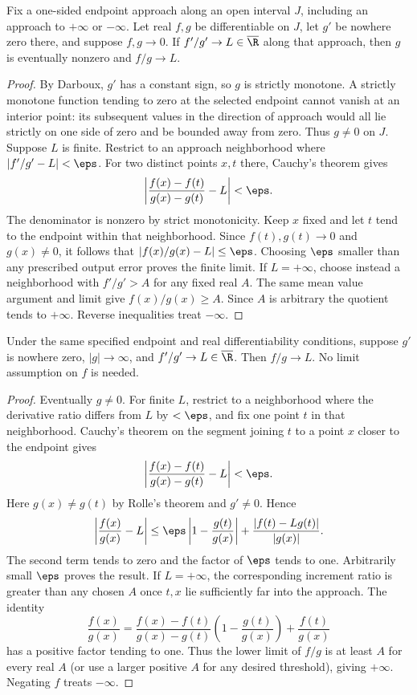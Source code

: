 \begin{theorem}
Fix a one-sided endpoint approach along an open interval $J$, including an approach to $+\infty$ or $-\infty$. Let real $f,g$ be differentiable on $J$, let $g'$ be nowhere zero there, and suppose $f,g\to0$. If $f'/g'\to L\in\overline\R$ along that approach, then $g$ is eventually nonzero and $f/g\to L$.
\end{theorem}
\begin{proof}
By Darboux, $g'$ has a constant sign, so $g$ is strictly monotone. A strictly monotone function tending to zero at the selected endpoint cannot vanish at an interior point: its subsequent values in the direction of approach would all lie strictly on one side of zero and be bounded away from zero. Thus $g\ne0$ on $J$.
Suppose $L$ is finite. Restrict to an approach neighborhood where $|f'/g'-L|<\eps$. For two distinct points $x,t$ there, Cauchy's theorem gives
\[ \left|\frac{f(x)-f(t)}{g(x)-g(t)}-L\right|<\eps. \]
The denominator is nonzero by strict monotonicity. Keep $x$ fixed and let $t$ tend to the endpoint within that neighborhood. Since $f(t),g(t)\to0$ and $g(x)\ne0$, it follows that $|f(x)/g(x)-L|\le\eps$. Choosing $\eps$ smaller than any prescribed output error proves the finite limit. If $L=+\infty$, choose instead a neighborhood with $f'/g'>A$ for any fixed real $A$. The same mean value argument and limit give $f(x)/g(x)\ge A$. Since $A$ is arbitrary the quotient tends to $+\infty$. Reverse inequalities treat $-\infty$.
\end{proof}

\begin{theorem}
Under the same specified endpoint and real differentiability conditions, suppose $g'$ is nowhere zero, $|g|\to\infty$, and $f'/g'\to L\in\overline\R$. Then $f/g\to L$. No limit assumption on $f$ is needed.
\end{theorem}
\begin{proof}
Eventually $g\ne0$. For finite $L$, restrict to a neighborhood where the derivative ratio differs from $L$ by $<\eps$, and fix one point $t$ in that neighborhood. Cauchy's theorem on the segment joining $t$ to a point $x$ closer to the endpoint gives
\[ \left|\frac{f(x)-f(t)}{g(x)-g(t)}-L\right|<\eps. \]
Here $g(x)\ne g(t)$ by Rolle's theorem and $g'\ne0$. Hence
\[ \left|\frac{f(x)}{g(x)}-L\right|\le\eps\left|1-\frac{g(t)}{g(x)}\right|+\frac{|f(t)-Lg(t)|}{|g(x)|}. \]
The second term tends to zero and the factor of $\eps$ tends to one. Arbitrarily small $\eps$ proves the result. If $L=+\infty$, the corresponding increment ratio is greater than any chosen $A$ once $t,x$ lie sufficiently far into the approach. The identity
\[ \frac{f(x)}{g(x)}=\frac{f(x)-f(t)}{g(x)-g(t)}\left(1-\frac{g(t)}{g(x)}\right)+\frac{f(t)}{g(x)} \]
has a positive factor tending to one. Thus the lower limit of $f/g$ is at least $A$ for every real $A$ (or use a larger positive $A$ for any desired threshold), giving $+\infty$. Negating $f$ treats $-\infty$.
\end{proof}

